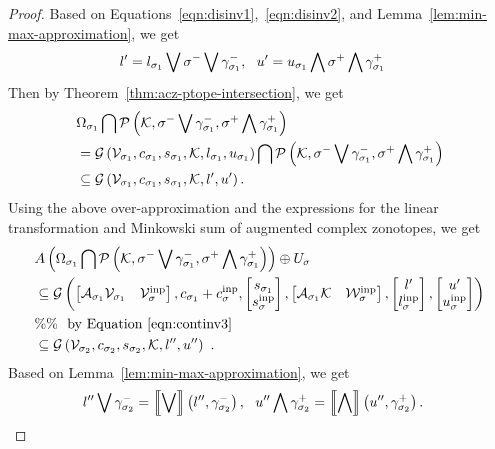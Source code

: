 \begin{proof}
Based on Equations~\ref{eqn:disinv1},~\ref{eqn:disinv2}, and Lemma~\ref{lem:min-max-approximation}, we get
%
\begin{align*}
&
l^\prime=l_{\sigma_1}\bigvee \sigma^-\bigvee \gamma_{\sigma_1}^-,
~~u^\prime=u_{\sigma_1}\bigwedge \sigma^+\bigwedge \gamma_{\sigma_1}^+
\end{align*}
%
Then by Theorem~\ref{thm:acz-ptope-intersection}, we get
%
\begin{align*}
& \Omega_{\sigma_1}\bigcap\mathcal{P}\left(\mathcal{K},\sigma^-\bigvee \gamma_{\sigma_1}^-,\sigma^+\bigwedge \gamma_{\sigma_1}^+\right)\\
& =\mathcal{G}\left(\mathcal{V}_{\sigma_1},c_{\sigma_1},s_{\sigma_1},\mathcal{K},l_{\sigma_1},u_{\sigma_1}\right)\bigcap\mathcal{P}\left(\mathcal{K},\sigma^-\bigvee \gamma_{\sigma_1}^-,\sigma^+\bigwedge \gamma_{\sigma_1}^+\right)\\
& \subseteq \mathcal{G}\left(\mathcal{V}_{\sigma_1},c_{\sigma_1},s_{\sigma_1},\mathcal{K},l^\prime,u^\prime\right).
\end{align*}
%
Using the above over-approximation and the expressions for the linear
transformation and Minkowski sum of augmented complex zonotopes, we
get
%
\begin{align}
& A\left(\Omega_{\sigma_1}\bigcap\mathcal{P}\left(\mathcal{K},\sigma^-\bigvee \gamma_{\sigma_1}^-,\sigma^+\bigwedge \gamma_{\sigma_1}^+\right)\right)\oplus U_{\sigma}\nonumber\\
& \subseteq \mathcal{G}\left(
\left[\begin{matrix}\mathcal{A}_{\sigma_1}\mathcal{V}_{\sigma_1} & \mathcal{V}^{\operatorname{inp}}_\sigma\end{matrix}\right]
,
c_{\sigma_1}+c^{\operatorname{inp}}_\sigma
,
\left[\begin{matrix}s_{\sigma_1}\\ s^{\operatorname{inp}}_\sigma\end{matrix}\right]
,
\left[\begin{matrix}\mathcal{A}_{\sigma_1}\mathcal{K} & \mathcal{W}^{\operatorname{inp}}_\sigma\end{matrix}\right]
,
\left[\begin{matrix}l^\prime\\l^{\operatorname{inp}}_\sigma\end{matrix}\right]
,
\left[\begin{matrix}u^\prime\\ u^{\operatorname{inp}}_\sigma\end{matrix}\right]
\right)\nonumber\\
& \%\%~~\text{by Equation~\ref{eqn:continv3}}\nonumber\\
& \subseteq \mathcal{G}\left(\mathcal{V}_{\sigma_2},c_{\sigma_2},s_{\sigma_2},\mathcal{K},l^{\prime\prime},u^{\prime\prime}\right)~\label{eqn:proof-continv1}.
\end{align}
%
Based on Lemma~\ref{lem:min-max-approximation}, we get
%
\begin{align*}
& l^{\prime\prime}\bigvee \gamma_{\sigma_2}^-=\left\llbracket\bigvee\right\rrbracket\left(l^{\prime\prime},\gamma_{\sigma_2}^-\right),~~
u^{\prime\prime}\bigwedge \gamma_{\sigma_2}^+=\left\llbracket\bigwedge\right\rrbracket\left(u^{\prime\prime},\gamma_{\sigma_2}^+\right).
\end{align*}

\end{proof}
